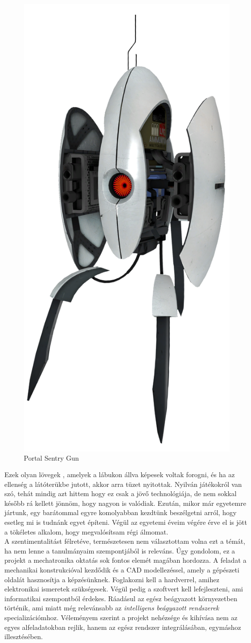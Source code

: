 \documentclass[12pt,a4paper]{article}
\begin{document}
\begin{figure}[h!]
\begin{minipage}{.5\textwidth}
		\includegraphics[width=0.6\linewidth]{irod_portal} 
		\caption{Portal Sentry Gun \cite{portal}}
		\label{fig:irod_portal}
	\end{minipage}
\end{figure}

Ezek olyan lövegek , amelyek a lábukon állva képesek voltak forogni, és ha az ellenség a látóterükbe jutott, akkor arra tüzet nyitottak. Nyilván játékokról van szó, tehát mindig azt hittem hogy ez csak a jövő technológiája, de nem sokkal később rá kellett jönnöm, hogy nagyon is valódiak. Ezután, mikor már egyetemre jártunk, egy barátommal egyre komolyabban kezdtünk beszélgetni arról, hogy esetleg mi is tudnánk egyet építeni. Végül az egyetemi éveim végére érve el is jött a tökéletes alkalom, hogy megvalósítsam régi álmomat. \\

A szentimentalitást félretéve, természetesen nem választottam volna ezt a témát, ha nem lenne a tanulmányaim szempontjából is releváns. Úgy gondolom, ez a projekt a mechatronika oktatás sok fontos elemét magában hordozza. A feladat a mechanikai konstrukcióval kezdődik és a CAD modellezéssel, amely a gépészeti oldalát hasznosítja a képzésünknek. Foglakozni kell a hardverrel, amihez elektronikai ismeretek szükségesek. Végül pedig a szoftvert kell lefejleszteni, ami informatikai szempontból érdekes. Ráadásul az egész beágyazott környezetben történik, ami miatt még relevánsabb az \textsl{intelligens beágyazott rendszerek} specializációmhoz. Véleményem szerint a projekt nehézsége és kihívása nem az egyes alfeladatokban rejlik, hanem az egész rendszer integrálásában, egymáshoz illesztésében. \\
\end{document}
